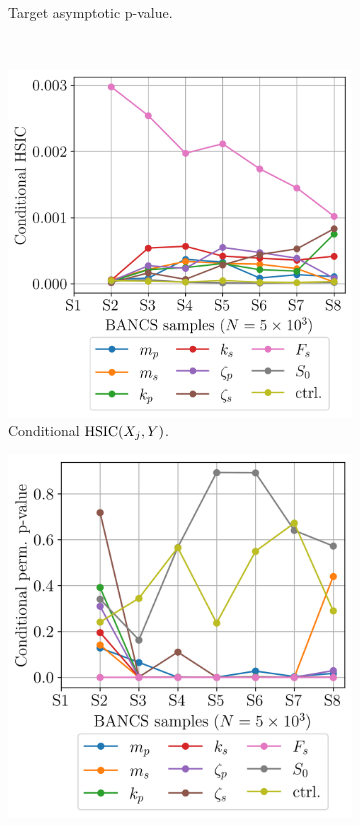 \begin{figure}
\begin{subfigure}[b]{0.48\linewidth}
        \caption{Target asymptotic p-value.}
    \end{subfigure}
    \\[20pt]
    \begin{subfigure}[b]{0.48\linewidth}
        \centering
        \includegraphics[width=\linewidth]{part3/figures/BANCS/oscillator_CHSIC.png}
        \caption{Conditional $\mathrm{HSIC}(X_j, Y)$.}
    \end{subfigure}
    \hfill
    \begin{subfigure}[b]{0.48\linewidth}
        \centering
        \includegraphics[width=\linewidth]{part3/figures/BANCS/oscillator_Cpvalue_permutation.png}

\end{subfigure}
\end{figure}
